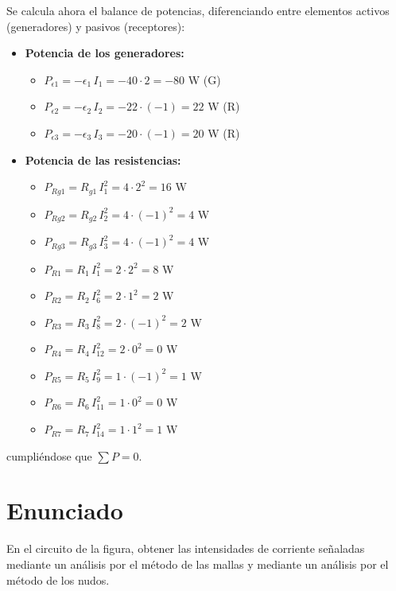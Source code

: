      Se calcula ahora el balance de potencias, diferenciando entre
     elementos activos (generadores) y pasivos (receptores):
     \begin{itemize}
     \item \textbf{Potencia de los generadores:}
       \begin{itemize}
       \item $P_{\epsilon1}=-\epsilon_1\,I_1=-40\cdot 2=-80$ W (G)
       \item $P_{\epsilon2}=-\epsilon_2\,I_2=-22\cdot (-1)=22$ W (R)
       \item $P_{\epsilon3}=-\epsilon_3\,I_3=-20\cdot (-1)=20$ W (R)
       \end{itemize}
     \item \textbf{Potencia de las resistencias:}
       \begin{itemize}
       \item $P_{Rg1}=R_{g1}\,I_1^2=4\cdot 2^2=16$ W
       \item $P_{Rg2}=R_{g2}\,I_2^2=4\cdot (-1)^2=4$ W
       \item $P_{Rg3}=R_{g3}\,I_3^2=4\cdot (-1)^2=4$ W
       \item $P_{R1}=R_1\,I_1^2=2\cdot 2^2=8$ W
       \item $P_{R2}=R_2\,I_6^2=2\cdot 1^2=2$ W
       \item $P_{R3}=R_3\,I_8^2=2\cdot (-1)^2=2$ W
       \item $P_{R4}=R_4\,I_{12}^2=2\cdot 0^2=0$ W
       \item $P_{R5}=R_5\,I_9^2=1\cdot (-1)^2=1$ W
       \item $P_{R6}=R_6\,I_{11}^2=1\cdot 0^2=0$ W
       \item $P_{R7}=R_7\,I_{14}^2=1\cdot 1^2=1$ W
       \end{itemize}
     \end{itemize}
     cumpliéndose que $\sum P = 0$.

     \section{Enunciado}
     En el circuito de la figura, obtener las intensidades de
     corriente señaladas mediante un análisis por el método de las
     mallas y mediante un análisis por el método de los nudos.

